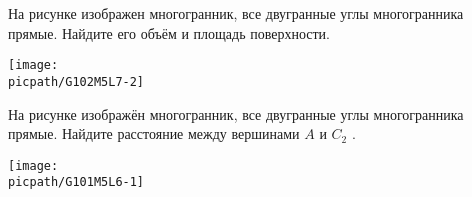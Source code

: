 \begin{class}[number=2]
\begin{listofex}
		\item 
		\begin{minipage}[t]{\bodywidth}
			На рисунке изображен многогранник, все двугранные углы многогранника прямые. Найдите его объём и площадь поверхности.
		\end{minipage}
		\hspace{0.02\linewidth}
		\begin{minipage}[t]{\picwidth}
			\texttt{[image: \\picpath/G102M5L7-2]}
		\end{minipage}
		\item 
		\begin{minipage}[t]{\bodywidth}
			На рисунке изображён многогранник, все двугранные углы многогранника прямые. Найдите расстояние между вершинами \(A\) и \(C_2\) .
		\end{minipage}
		\hspace{0.02\linewidth}
		\begin{minipage}[t]{\picwidth}
			\texttt{[image: \\picpath/G101M5L6-1]}
		\end{minipage}

\end{listofex}
\end{class}
